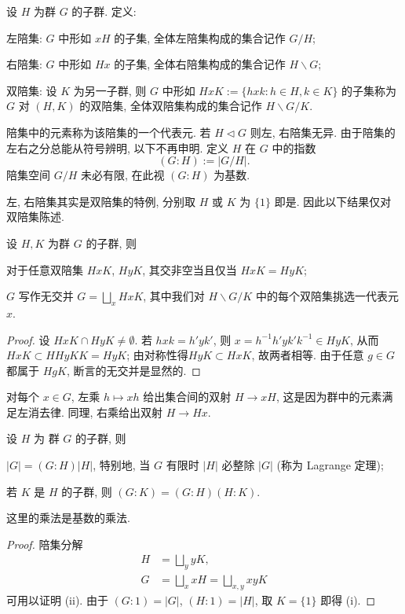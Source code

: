 \begin{definition}[陪集]\label{def:coset}
	设 $H$ 为群 $G$ 的子群. 定义:
	\begin{compactitem}
		\item 左陪集: $G$ 中形如 $xH$ 的子集, 全体左陪集构成的集合记作 $G/H$;
		\item 右陪集: $G$ 中形如 $Hx$ 的子集, 全体右陪集构成的集合记作 $H \backslash G$;
		\item 双陪集: 设 $K$ 为另一子群, 则 $G$ 中形如 $HxK := \{hxk : h \in H, k \in K\}$ 的子集称为 $G$ 对 $(H,K)$ 的双陪集, 全体双陪集构成的集合记作 $H \backslash G/K$.
	\end{compactitem}
	陪集中的元素称为该陪集的一个代表元. 若 $H \lhd G$ 则左, 右陪集无异. 由于陪集的左右之分总能从符号辨明, 以下不再申明. 定义 $H$ 在 $G$ 中的指数
	\[ (G:H) := |G/H|. \]
	陪集空间 $G/H$ 未必有限, 在此视 $(G:H)$ 为基数. 
\end{definition}
左, 右陪集其实是双陪集的特例, 分别取 $H$ 或 $K$ 为 $\{1\}$ 即是. 因此以下结果仅对双陪集陈述.
\begin{lemma}\label{prop:coset-decomp}
	设 $H, K$ 为群 $G$ 的子群, 则
	\begin{compactenum}[(i)]
		\item 对于任意双陪集 $HxK$, $HyK$, 其交非空当且仅当 $HxK = HyK$;
		\item $G$ 写作无交并 $G = \bigsqcup_x HxK$, 其中我们对 $H \backslash G / K$ 中的每个双陪集挑选一代表元 $x$.
	\end{compactenum}
\end{lemma}
\begin{proof}
	设 $HxK \cap HyK \neq \emptyset$. 若 $hxk = h'yk'$, 则 $x = h^{-1}h' y k' k^{-1} \in HyK$, 从而 $HxK \subset HHyKK = HyK$; 由对称性得$HyK \subset HxK$, 故两者相等. 由于任意 $g \in G$ 都属于 $HgK$, 断言的无交并是显然的.
\end{proof}

对每个 $x \in G$, 左乘 $h \mapsto xh$ 给出集合间的双射 $H \to xH$, 这是因为群中的元素满足左消去律. 同理, 右乘给出双射 $H \to Hx$.

\begin{proposition}\label{prop:Lagrange}
	设 $H$ 为 群 $G$ 的子群, 则
	\begin{compactenum}[(i)]
		\item $|G| = (G:H) |H|$, 特别地, 当 $G$ 有限时 $|H|$ 必整除 $|G|$ (称为 Lagrange 定理);
		\item 若 $K$ 是 $H$ 的子群, 则 $(G:K) =(G:H)(H:K)$.
	\end{compactenum}
	这里的乘法是基数的乘法.
\end{proposition}
\begin{proof}
	陪集分解
	\begin{align*}
		H &= \bigsqcup_y yK, \\
		G &= \bigsqcup_x xH = \bigsqcup_{x,y} xyK 
	\end{align*}
	可用以证明 (ii). 由于 $(G:1)=|G|$, $(H:1)=|H|$, 取 $K=\{1\}$ 即得 (i). 
\end{proof}

